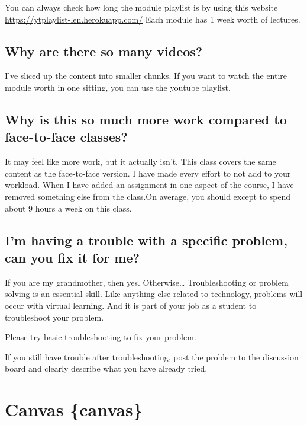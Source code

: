 You can always check how long the module playlist is by using this website \url{https://ytplaylist-len.herokuapp.com/}
Each module has 1 week worth of lectures.

\hypertarget{why-are-there-so-many-videos}{%
\subsection{Why are there so many videos?}\label{why-are-there-so-many-videos}}

I've sliced up the content into smaller chunks.
If you want to watch the entire module worth in one sitting, you can use the youtube playlist.

\hypertarget{why-is-this-so-much-more-work-compared-to-face-to-face-classes}{%
\subsection{Why is this so much more work compared to face-to-face classes?}\label{why-is-this-so-much-more-work-compared-to-face-to-face-classes}}

It may feel like more work, but it actually isn't. This class covers the same content as the face-to-face version. I have made every effort to not add to your workload. When I have added an assignment in one aspect of the course, I have removed something else from the class.On average, you should except to spend about 9 hours a week on this class.

\hypertarget{im-having-a-trouble-with-a-specific-problem-can-you-fix-it-for-me}{%
\subsection{I'm having a trouble with a specific problem, can you fix it for me?}\label{im-having-a-trouble-with-a-specific-problem-can-you-fix-it-for-me}}

If you are my grandmother, then yes. Otherwise\ldots{} Troubleshooting or problem solving is an essential skill. Like anything else related to technology, problems will occur with virtual learning. And it is part of your job as a student to troubleshoot your problem.

Please try basic troubleshooting to fix your problem.

If you still have trouble after troubleshooting, post the problem to the discussion board and clearly describe what you have already tried.

\hypertarget{canvas-canvas}{%
\section{Canvas \{canvas\}}\label{canvas-canvas}}

